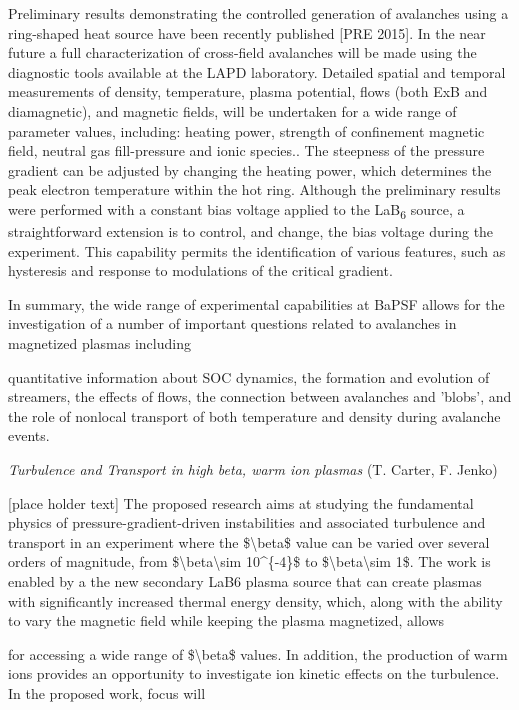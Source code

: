 \documentclass[11pt]{article}
\begin{document}
\begin{description}
Preliminary results demonstrating the controlled generation of
avalanches using a ring-shaped heat source have been recently published
{[}PRE 2015{]}. In the near future a full characterization of
cross-field avalanches will be made using the diagnostic tools available
at the LAPD laboratory. Detailed spatial and temporal measurements of
density, temperature, plasma potential, flows (both ExB and
diamagnetic), and magnetic fields, will be undertaken for a wide range
of parameter values, including: heating power, strength of confinement
magnetic field, neutral gas fill-pressure and ionic species.. The
steepness of the pressure gradient can be adjusted by changing the
heating power, which determines the peak electron temperature within the
hot ring. Although the preliminary results were performed with a
constant bias voltage applied to the LaB\textsubscript{6} source, a
straightforward extension is to control, and change, the bias voltage
during the experiment. This capability permits the identification of
various features, such as hysteresis and response to modulations of the
critical gradient.

In summary, the wide range of experimental capabilities at BaPSF allows
for the investigation of a number of important questions related to
avalanches in magnetized plasmas including

quantitative information about SOC dynamics, the formation and evolution
of streamers, the effects of flows, the connection between avalanches
and 'blobs', and the role of nonlocal transport of both temperature and
density during avalanche events.


\emph{Turbulence and Transport in high beta, warm ion plasmas} (T.
Carter, F. Jenko)


{[}place holder text{]} The proposed research aims at studying the
fundamental physics of pressure-gradient-driven instabilities and
associated turbulence and transport in an experiment where the
\$\textbackslash{}beta\$ value can be varied over several orders of
magnitude, from \$\textbackslash{}beta\textbackslash{}sim 10\^{}\{-4\}\$
to \$\textbackslash{}beta\textbackslash{}sim 1\$. The work is enabled by
a the new secondary LaB6 plasma source that can create plasmas with
significantly increased thermal energy density, which, along with the
ability to vary the magnetic field while keeping the plasma magnetized,
allows

for accessing a wide range of \$\textbackslash{}beta\$ values. In
addition, the production of warm ions provides an opportunity to
investigate ion kinetic effects on the turbulence. In the proposed work,
focus will


\end{description}
\end{document}
